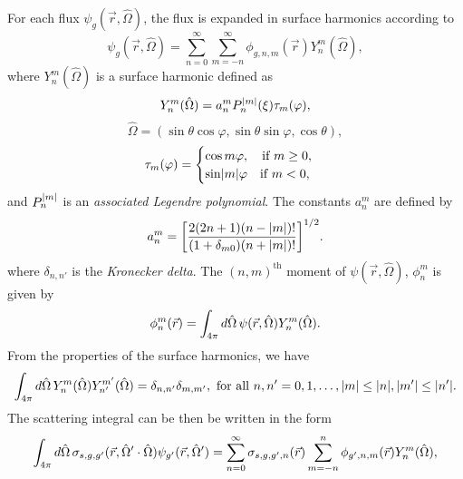 For each flux $\psi_{g}(\vec{r},\hat{\Omega})$, the flux is expanded in surface harmonics according to
\begin{equation}
	\psi_{g}(\vec{r},\hat{\Omega}) = \sum_{n=0}^{\infty} \sum_{m=-n}^{\infty} \phi_{g,n,m}(\vec{r}) Y_{n}^{m}(\hat{\Omega}),
\end{equation}
where $Y_{n}^{m}(\hat{\Omega})$ is a surface harmonic defined as
\begin{equation}
	Y_{n}^{m}(\hat{\Omega}) = a_{n}^{m} P_{n}^{\lvert m\rvert}(\xi) \tau_{m}(\varphi),
\end{equation}
\begin{equation}
\hat{\Omega} = (\sin \theta \cos \varphi, \sin \theta \sin \varphi, \cos \theta),
\end{equation}
\begin{equation}
	\tau_{m}(\varphi) = \begin{cases}
					\cos m\varphi, \quad \text{if } m \geq 0, \\
					\sin \lvert m\rvert \varphi \quad \text{if } m < 0,
				      \end{cases}
\end{equation}
and $P_{n}^{\lvert m\rvert}$ is an \textit{associated Legendre polynomial}. The constants $a_{n}^{m}$ are defined by
\begin{equation}
	a_{n}^{m} = \bigg [ \frac{2(2n+1)(n-\lvert m\rvert)!}{(1+\delta_{m0})(n + \lvert m\rvert)!} \bigg ]^{1/2}.
\end{equation}
where $\delta_{n,n'}$ is the \textit{Kronecker delta}. The $(n,m)^{\text{th}}$ moment of $\psi(\vec{r}, \hat{\Omega})$, $\phi_{n}^{m}$ is given by
\begin{equation}
	\phi_{n}^{m}(\vec{r}) = \int_{4\pi} \mathop{}\!d \hat{\Omega} \, \psi(\vec{r},\hat{\Omega}) Y_{n}^{m}(\hat{\Omega}).
\end{equation}
From the properties of the surface harmonics, we have
\begin{equation}
	\int_{4\pi} \mathop{}\!d \hat{\Omega} \, Y_{n}^{m}(\hat{\Omega}) Y_{n'}^{m'}(\hat{\Omega}) = \delta_{n,n'} \delta_{m,m'}, \text{ for all } n, n' = 0, 1, \dots, \lvert m\rvert \leq \lvert n\rvert, \lvert m'\rvert \leq \lvert n'\rvert.
\end{equation}
The scattering integral can be then be written in the form
\begin{equation}
	\int_{4\pi} \mathop{}\!d \hat{\Omega} \, \sigma_{s,g,g'}(\vec{r},\hat{\Omega}' \cdot \hat{\Omega}) \psi_{g'}(\vec{r},\hat{\Omega}') = \sum_{n=0}^{\infty} \sigma_{s,g,g',n}(\vec{r}) \sum_{m=-n}^{n} \phi_{g',n,m}(\vec{r})Y_{n}^{m}(\hat{\Omega}),
	\label{eq:ScattInt}
\end{equation}
